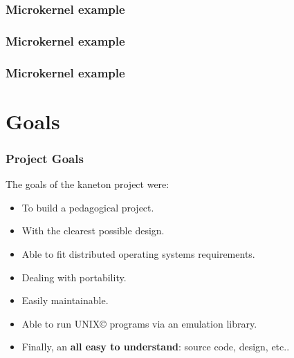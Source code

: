 \begin{frame}
  \frametitle{Microkernel example}

  \begin{center}
  \end{center}
\end{frame}

\begin{frame}
  \frametitle{Microkernel example}

  \begin{center}
  \end{center}
\end{frame}

\begin{frame}
  \frametitle{Microkernel example}

  \begin{center}
  \end{center}
\end{frame}


%
%

\section{Goals}


\begin{frame}
  \frametitle{Project Goals}

  The goals of the kaneton project were:

  \begin{itemize}[<+->]
    \item
      To build a pedagogical project.
    \item
      With the clearest possible design.
    \item
      Able to fit distributed operating systems requirements.
    \item
      Dealing with portability.
    \item
      Easily maintainable.
    \item
      Able to run UNIX{\scriptsize \copyright} programs via
      an emulation library.
    \item
      Finally, an \textbf{all easy to understand}: source code, design,
      etc..
  \end{itemize}
\end{frame}

%
%

